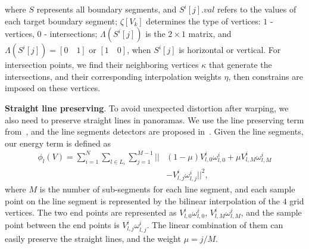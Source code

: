 \documentclass[10pt,journal,compsoc]{IEEEtran}
\begin{document}
where $S$ represents all boundary segments, and $S^i[j].val$ refers to the values of each target boundary segment;
$\zeta[V_k]$ determines the type of vertices: $1$ - vertices, $0$ - intersections;
$\Lambda(S^i[j])$ is the $2\times1$ matrix, and $\Lambda(S^i[j])=[0\quad 1] $ or $[1\quad 0]$, when $S^i[j]$ is horizontal or vertical.
For intersection points, we find their neighboring vertices $\kappa$ that generate the intersections, and their corresponding interpolation weights $\eta$,
then constrains are imposed on these vertices.

\textbf{Straight line preserving}.
To avoid unexpected distortion after warping, we also need to preserve straight lines in panoramas.
We use the line preserving term from~\cite{journals/cgf/LinLCZ16}, and the line segments detectors are proposed in~\cite{journals/pami/GioiJMR10}.
Given the line segments, our energy term is defined as
\begin{equation} \label{equ:line_preserving}
\begin{split}
    \phi_l(V) = \sum\limits_{i=1}^N\sum\limits_{l \in L_i}\sum\limits_{j=1}^{M-1}||&(1-\mu)V_{l, 0}^i \omega_{l, 0}^i + \mu V_{l, M}^i \omega_{l, M}^i\\
    &-V_{l, j}^i \omega_{l, j}^i||^2,
\end{split}
\end{equation}
where $M$ is the number of sub-segments for each line segment, and each sample point on the line segment is represented by the bilinear interpolation of the $4$ grid vertices. The two end points are represented as $V_{l, 0}^i \omega_{l, 0}^i$, $V_{l, M}^i \omega_{l, M}^i$, and the sample point between the end points is $V_{l, j}^i \omega_{l, j}^i$.
The linear combination of them can easily preserve the straight lines, and the weight $\mu=j/M$.
\end{document}

